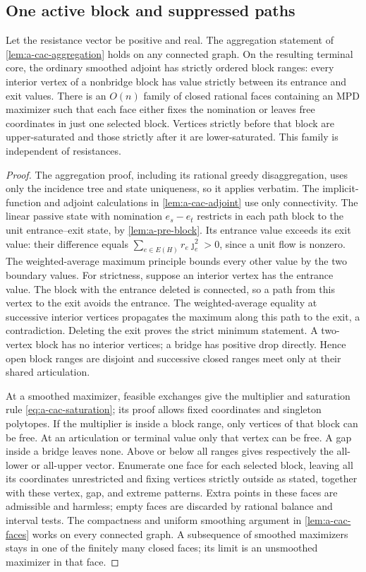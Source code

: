 \subsection{One active block and suppressed paths}
\begin{lemma}
\label{lem:a-blk-order}
Let the resistance vector be positive and real.
The aggregation statement of \cref{lem:a-cac-aggregation} holds on
any connected graph. On the resulting terminal core, the ordinary
smoothed adjoint has strictly ordered block ranges: every interior
vertex of a nonbridge block has value strictly between its entrance
and exit values. There is an $O(n)$ family of closed rational faces
containing an MPD maximizer such that each face either fixes the
nomination or leaves free coordinates in just one selected block.
Vertices strictly before that block are upper-saturated and those
strictly after it are lower-saturated. This family is independent of
resistances.
\end{lemma}
\begin{proof}
The aggregation proof, including its rational greedy disaggregation,
uses only the incidence tree and state uniqueness, so it applies verbatim.
The implicit-function and adjoint calculations in
\cref{lem:a-cac-adjoint} use only connectivity. The linear passive
state with nomination $e_s-e_t$ restricts in each path block to the
unit entrance--exit state, by \cref{lem:a-pre-block}.
Its entrance value exceeds its exit value: their difference equals
$\sum_{e\in E(H)}r_e\jmath_e^2>0$, since a unit flow is nonzero.
The weighted-average maximum principle bounds every other value by
the two boundary values. For strictness, suppose an interior vertex
has the entrance value. The block with the entrance deleted is
connected, so a path from this vertex to the exit avoids the entrance.
The weighted-average equality at successive interior vertices propagates
the maximum along this path to the exit, a contradiction. Deleting
the exit proves the strict minimum statement. A two-vertex block has
no interior vertices; a bridge has positive drop directly.
Hence open block ranges are disjoint and successive closed
ranges meet only at their shared articulation.

At a smoothed maximizer, feasible exchanges give the multiplier and
saturation rule \cref{eq:a-cac-saturation}; its proof allows fixed
coordinates and singleton polytopes. If the multiplier is inside a
block range, only vertices of that block can be free. At an articulation
or terminal value only that vertex can be free. A gap inside a bridge
leaves none. Above or below all ranges gives respectively the all-lower
or all-upper vector. Enumerate one face for each selected block, leaving
all its coordinates unrestricted and fixing vertices strictly outside
as stated, together with these vertex, gap, and extreme patterns.
Extra points in these faces are admissible and harmless; empty faces
are discarded by rational balance and interval tests.
The compactness and uniform smoothing argument in
\cref{lem:a-cac-faces} works on every connected graph. A subsequence of
smoothed maximizers stays in one of the finitely many closed faces;
its limit is an unsmoothed maximizer in that face.
\end{proof}


